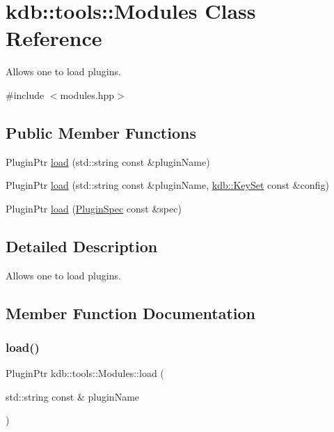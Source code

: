 \hypertarget{classkdb_1_1tools_1_1Modules}{}\section{kdb\+::tools\+::Modules Class Reference}
\label{classkdb_1_1tools_1_1Modules}


Allows one to load plugins.  




{\ttfamily \#include $<$modules.\+hpp$>$}

\subsection*{Public Member Functions}
\begin{DoxyCompactItemize}
\item 
Plugin\+Ptr \mbox{\hyperlink{classkdb_1_1tools_1_1Modules_ae8d8c91745c9f517e6e8a556f1664f69}{load}} (std\+::string const \&plugin\+Name)
\item 
Plugin\+Ptr \mbox{\hyperlink{classkdb_1_1tools_1_1Modules_a6ae72cc8e30fe3fb0aabd6f78fad8ddf}{load}} (std\+::string const \&plugin\+Name, \mbox{\hyperlink{classkdb_1_1KeySet}{kdb\+::\+Key\+Set}} const \&config)
\item 
Plugin\+Ptr \mbox{\hyperlink{classkdb_1_1tools_1_1Modules_abdbcc54896557ad3123d0a12be9f437a}{load}} (\mbox{\hyperlink{classkdb_1_1tools_1_1PluginSpec}{Plugin\+Spec}} const \&spec)
\end{DoxyCompactItemize}


\subsection{Detailed Description}
Allows one to load plugins. 

\subsection{Member Function Documentation}
\mbox{\label{classkdb_1_1tools_1_1Modules_ae8d8c91745c9f517e6e8a556f1664f69}} 
\subsubsection{\texorpdfstring{load()}{load()}\hspace{0.1cm}{\footnotesize\ttfamily [1/3]}}
{\footnotesize\ttfamily Plugin\+Ptr kdb\+::tools\+::\+Modules\+::load (\begin{DoxyParamCaption}\item[{std\+::string const \&}]{plugin\+Name }\end{DoxyParamCaption})}

